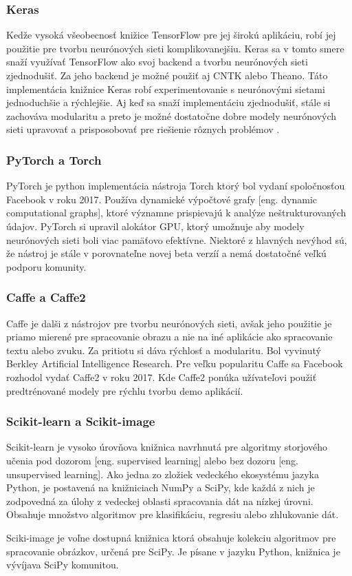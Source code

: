 \subsubsection{Keras}

Kedže vysoká všeobecnosť knižice TensorFlow pre jej širokú aplikáciu, robí jej použitie pre tvorbu neurónových sieti komplikovanejšiu.
Keras sa v tomto smere snaží využívať TensorFlow ako svoj backend a tvorbu neurónových sieti zjednodušiť.
Za jeho backend je možné použiť aj CNTK alebo Theano.
Táto implementácia knižnice Keras robí experimentovanie s neurónovými sietami jednoduchšie a rýchlejšie.
Aj keď sa snaží implementáciu zjednodušiť, stále si zachováva modularitu a preto je možné dostatočne dobre modely neurónových sieti upravovať a prisposobovať pre riešienie rôznych problémov \cite{odkaz:Keras}.

\subsubsection{PyTorch a Torch}

PyTorch je python implementácia nástroja Torch ktorý bol vydaní spoločnosťou Facebook v roku 2017.
Používa dynamické výpočtové grafy [eng. dynamic computational graphs], ktoré významne prispievajú k analýze neštrukturovaných údajov.
PyTorch si upravil alokátor GPU, ktorý umožnuje aby modely neurónových sieti boli viac pamäťovo efektívne.
Niektoré z hlavných nevýhod sú, že nástroj je stále v porovnateľne novej beta verzíí a nemá dostatočné veľkú podporu komunity\cite{odkaz:FrameworkComparison}.

\subsubsection{Caffe a Caffe2}

Caffe je dalši z nástrojov pre tvorbu neurónových sieti, avšak jeho použitie je priamo mierené pre spracovanie obrazu a nie na iné aplikácie
    ako spracovanie textu alebo zvuku\cite{odkaz:FrameworkComparison2}.
Za pritiotu si dáva rýchlosť a modularitu. Bol vyvinutý Berkley Artificial Intelligence Research.
Pre veľku popularitu Caffe sa Facebook rozhodol vydať Caffe2 v roku 2017.
Kde Caffe2 ponúka užívateľovi použiť predtrénované modely pre rýchlu tvorbu demo aplikácií\cite{odkaz:FrameworkComparison}.

\subsubsection{Scikit-learn a Scikit-image}

Scikit-learn je vysoko úrovňova knižnica navrhnutá pre algoritmy storjového učenia pod dozorom [eng. supervised learning] alebo bez dozoru [eng. unsupervised learning].
Ako jedna zo zložiek vedeckého ekosystému jazyka Python, je postavená na knižniciach NumPy a SciPy, kde každá z nich je zodpovedná za úlohy z vedeckej oblasti spracovania dát na nízkej úrovni.
Obsahuje množstvo algoritmov pre klasifikáciu, regresiu alebo zhlukovanie dát\cite{odkaz:FrameworkComparison3}.

Sciki-image je voľne dostupná knižnica ktorá obsahuje kolekciu algoritmov pre spracovanie obrázkov, určená pre SciPy.
Je písane v jazyku Python, knižnica je vývíjava SciPy komunitou\cite{prop:scikit-image}.
